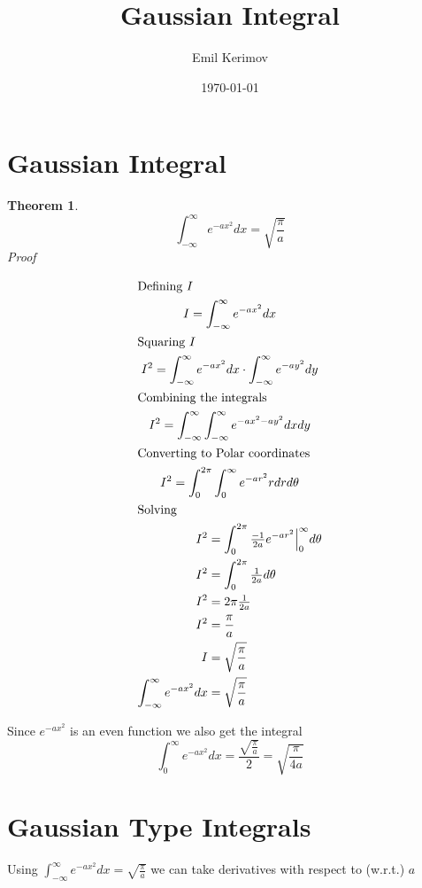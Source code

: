 \documentclass[a4paper]{article}
\title{Gaussian Integral}
\author{Emil Kerimov}
\date{\today}
\numberwithin{equation}{subsection}
\newtheorem{theorem}{Theorem}[section]
\begin{document}
\maketitle

\section{Gaussian Integral} 

\begin{theorem}
$$
\int_{-\infty}^{\infty}{e^{-ax^2}}dx = \sqrt{\frac{\pi}{a}}
$$
Proof

\begin{gather*}
\shortintertext{Defining $I$}
I = \int_{-\infty}^{\infty}{e^{-ax^2}}dx\\
\shortintertext{Squaring $I$}
I^2 = \int_{-\infty}^{\infty}{e^{-ax^2}}dx \cdot \int_{-\infty}^{\infty}{e^{-ay^2}}dy\\
\shortintertext{Combining the integrals}
I^2 = \int_{-\infty}^{\infty} \int_{-\infty}^{\infty}{e^{-ax^2 - ay^2}}dx dy\\
\shortintertext{Converting to Polar coordinates}
I^2 = \int_{0}^{2 \pi} \int_{0}^{\infty}{e^{-ar^2}}rdr d\theta\\
\shortintertext{Solving}
\begin{alignedat}{2}
I^2 &= \int_{0}^{2 \pi} \tfrac{-1}{2a} e^{-ar^2} \Big|_0^{\infty} d\theta \\
I^2 &= \int_{0}^{2 \pi} \tfrac{1}{2a} d\theta \\
I^2 &= 2 \pi \tfrac{1}{2a} \\
I^2 &= \frac{\pi}{a} \\
I &= \sqrt{\frac{\pi}{a}} \\
\int_{-\infty}^{\infty}{e^{-ax^2}}dx &= \sqrt{\frac{\pi}{a}} \\
\end{alignedat}
\end{gather*}
\end{theorem}

Since $e^{-ax^2}$ is an even function we also get the integral
\begin{equation}
\int_{0}^{\infty}{e^{-ax^2}}dx = \frac{\sqrt{\frac{\pi}{a}}}{2} = \sqrt{\frac{\pi}{4a}} 
\end{equation}

\section{Gaussian Type Integrals} 
Using $
\int_{-\infty}^{\infty}{e^{-ax^2}}dx = \sqrt{\frac{\pi}{a}}
$ we can take derivatives with respect to (w.r.t.) $a$
 
\end{document}
